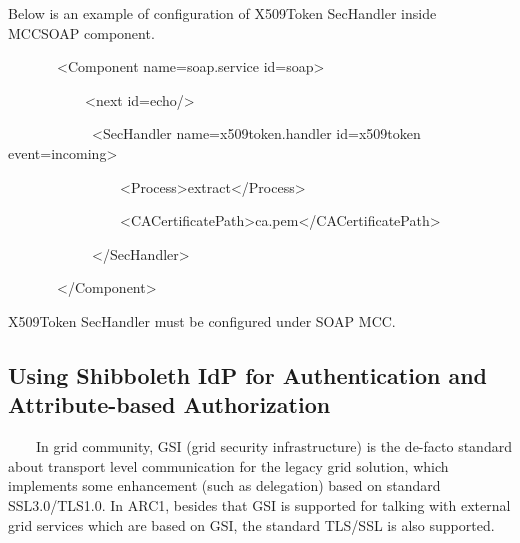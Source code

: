 \documentclass[a4paper]{article}
\begin{document}
{\upshape\color{black}
Below is an example of configuration of X509Token SecHandler inside
MCCSOAP component.}

{\ttfamily\color{black}
\ \ \ \ \ \ \ {\textless}Component
name={\textquotedbl}soap.service{\textquotedbl}
id={\textquotedbl}soap{\textquotedbl}{\textgreater}}

{\ttfamily\color{black}
\ \ \ \ \ \ \ \ \ \ \ {\textless}next
id={\textquotedbl}echo{\textquotedbl}/{\textgreater}}

{\ttfamily\color{black}
\ \ \ \ \ \ \ \ \ \ \ \ {\textless}SecHandler
name={\textquotedbl}x509token.handler{\textquotedbl}
id={\textquotedbl}x509token{\textquotedbl}
event={\textquotedbl}incoming{\textquotedbl}{\textgreater}}


\bigskip

{\ttfamily\color{black}
\ \ \ \ \ \ \ \ \ \ \ \ \ \ \ \ {\textless}Process{\textgreater}extract{\textless}/Process{\textgreater}}


\bigskip

{\ttfamily\color{black}
\ \ \ \ \ \ \ \ \ \ \ \ \ \ \ \ {\textless}CACertificatePath{\textgreater}ca.pem{\textless}/CACertificatePath{\textgreater}}


\bigskip

{\ttfamily\color{black}
\ \ \ \ \ \ \ \ \ \ \ \ {\textless}/SecHandler{\textgreater}}


\bigskip

{\ttfamily\color{black}
\ \ \ \ \ \ \ {\textless}/Component{\textgreater}}

{\color{black}
X509Token SecHandler must be configured under SOAP MCC.}


\bigskip

\subsection[Using Shibboleth IdP for Authentication and
Attribute{}-based Authorization]{Using
\foreignlanguage{english}{Shibboleth} IdP for Authentication and
Attribute-based Authorization}
{\color{black}
\ \ \ \ In grid community, GSI (grid security infrastructure) is the
de-facto standard about transport level communication for the legacy
grid solution, which implements some enhancement (such as delegation)
based on standard SSL3.0/TLS1.0. In ARC1, besides that GSI is supported
for talking with external grid services which are based on GSI, the
standard TLS/SSL is also supported.}
\end{document}

